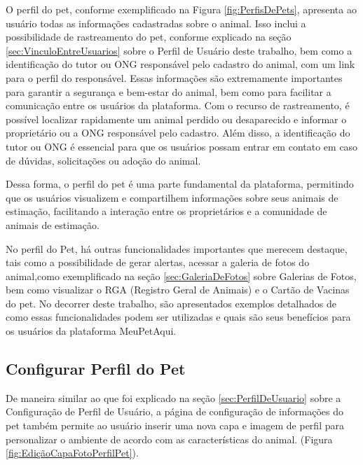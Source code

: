 O perfil do pet, conforme exemplificado na Figura \ref{fig:PerfisDePets}, apresenta ao usuário todas as informações cadastradas sobre o animal. Isso inclui a possibilidade de rastreamento do pet, conforme explicado na seção \ref{sec:VinculoEntreUsuarios} sobre o Perfil de Usuário deste trabalho, bem como a identificação do tutor ou ONG responsável pelo cadastro do animal, com um link para o perfil do responsável.
\newpage
Essas informações são extremamente importantes para garantir a segurança e bem-estar do animal, bem como para facilitar a comunicação entre os usuários da plataforma. Com o recurso de rastreamento, é possível localizar rapidamente um animal perdido ou desaparecido e informar o proprietário ou a ONG responsável pelo cadastro. Além disso, a identificação do tutor ou ONG é essencial para que os usuários possam entrar em contato em caso de dúvidas, solicitações ou adoção do animal.

Dessa forma, o perfil do pet é uma parte fundamental da plataforma, permitindo que os usuários visualizem e compartilhem informações sobre seus animais de estimação, facilitando a interação entre os proprietários e a comunidade de animais de estimação.

No perfil do Pet, há outras funcionalidades importantes que merecem destaque, tais como a possibilidade de gerar alertas, acessar a galeria de fotos do animal,como exemplificado na seção \ref{sec:GaleriaDeFotos} sobre Galerias de Fotos, bem como visualizar o RGA (Registro Geral de Animais) e o Cartão de Vacinas do pet. No decorrer deste trabalho, são apresentados exemplos detalhados de como essas funcionalidades podem ser utilizadas e quais são seus benefícios para os usuários da plataforma MeuPetAqui.

\newpage
\subsection{Configurar Perfil do Pet}
De maneira similar ao que foi explicado na seção \ref{sec:PerfilDeUsuario} sobre a Configuração de Perfil de Usuário, a página de configuração de informações do pet também permite ao usuário inserir uma nova capa e imagem de perfil para personalizar o ambiente de acordo com as características do animal. (Figura \ref{fig:EdiçãoCapaFotoPerfilPet}).

